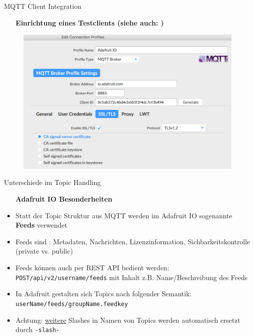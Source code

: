 \begin{frame}{MQTT Client Integration}
        \begin{itemize}
        \setlength{\itemindent}{4.1in}
        \item [\textbf{Einrichtung eines Testclients (siehe auch:  \cite{Adafruit MQTTFx Setup}) }]
    \end{itemize}
      \vspace*{-5mm}

  \begin{figure}[!htb]
  \hspace*{2mm}
        \includegraphics[scale=0.4]{7-datenaustausch/img/mqttfxsettings} 
    \end{figure}
\end{frame}


\begin{frame}{Unterschiede im Topic Handling}
    \begin{itemize}
        \setlength{\itemindent}{1.6in}
        \item [\textbf{Adafruit IO Besonderheiten}]
    \end{itemize}
    \begin{itemize}
        \item Statt der Topic Struktur aus MQTT werden im Adafruit IO sogenannte  \textbf{Feeds} verwendet \cite{io.adafruit.com/api/docs}
        \item Feeds sind : Metadaten, Nachrichten, Lizenzinformation, Sichbarkeitskontrolle (private vs. public)
        \item Feeds können auch per REST API bedient werden:  \texttt{POST/api/v2/{username}/feeds} mit Inhalt z.B. Name/Beschreibung des Feeds
        \item In Adafruit gestalten sich Topics nach folgender Semantik: \texttt{userName/feeds/groupName.feedkey} \cite{Adafruit und MQTT Topics}
        \item Achtung: \underline{weitere} Slashes in Namen von Topics werden automatisch ersetzt durch \texttt{-slash-}
    \end{itemize}    
\end{frame}

